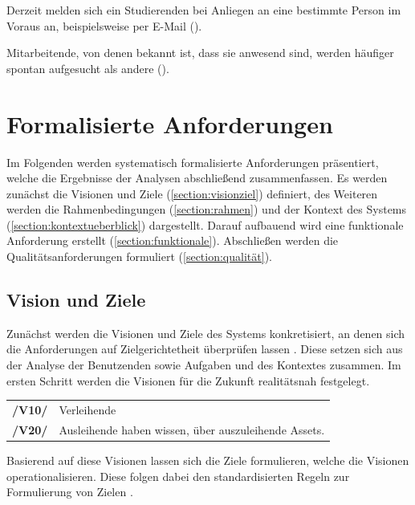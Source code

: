 Derzeit melden sich ein Studierenden bei Anliegen an eine bestimmte Person im Voraus an,
beispielsweise per E-Mail ().

Mitarbeitende, von denen bekannt ist, dass sie anwesend sind, werden häufiger spontan aufgesucht als
andere ().


\section{Formalisierte Anforderungen}
\label{section:anforderung}

Im Folgenden werden systematisch formalisierte Anforderungen präsentiert, welche die Ergebnisse der
Analysen abschließend zusammenfassen. Es werden zunächst die Visionen und Ziele
(\ref{section:visionziel}) definiert, des Weiteren werden die Rahmenbedingungen
(\ref{section:rahmen}) und der Kontext des Systems (\ref{section:kontextueberblick}) dargestellt.
Darauf aufbauend wird eine funktionale Anforderung erstellt (\ref{section:funktionale}). Abschließen
werden die Qualitätsanforderungen formuliert (\ref{section:qualität}).


\subsection*{Vision und Ziele}
\label{section:visionziel}
Zunächst werden die Visionen und Ziele des Systems konkretisiert, an denen sich die Anforderungen
auf Zielgerichtetheit überprüfen lassen \cite{balzert2009}. Diese setzen sich aus der Analyse der
Benutzenden sowie Aufgaben und des Kontextes zusammen. Im ersten Schritt werden die Visionen für die
Zukunft realitätsnah festgelegt.



\begin{center}
        \renewcommand{\arraystretch}{1.5}
        \begin{tabular}{p{}p{}}
                \hline
                \textbf{/V10/} & Verleihende   \\
                \textbf{/V20/} & Ausleihende haben wissen, über auszuleihende Assets. \\
                \hline
        \end{tabular}
\end{center}

Basierend auf diese Visionen lassen sich die Ziele formulieren, welche die Visionen
operationalisieren. Diese folgen dabei den standardisierten Regeln zur Formulierung von Zielen
\cite{pohl_requirements_2008}.


